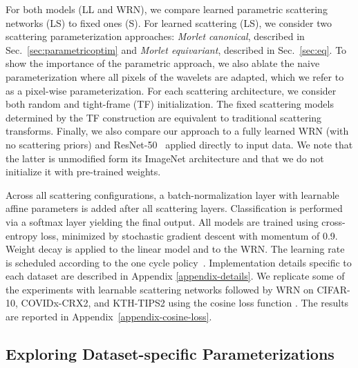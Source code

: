 \documentclass[10pt,twocolumn,letterpaper]{article}
\begin{document}
For both models (LL and WRN), we compare learned parametric scattering networks (LS) to fixed ones (S). For learned scattering (LS), we consider two scattering parameterization approaches: \textit{Morlet canonical}, described in Sec.~\ref{sec:parametricoptim} and \textit{Morlet equivariant},  described in Sec.~\ref{sec:eq}. To show the importance of the parametric approach, we also ablate the naive parameterization where all pixels of the wavelets are adapted, which we refer to as a pixel-wise parameterization.
For each scattering architecture, we consider both random and tight-frame (TF) initialization.  The fixed scattering models determined by the TF construction are equivalent to traditional scattering transforms. Finally, we also compare our approach to a fully learned WRN (with no scattering priors) and ResNet-50~\cite{he2016deep} applied directly to input data. We note that the latter is unmodified form its ImageNet architecture and that we do not initialize it with pre-trained weights. 

Across all scattering configurations, a batch-normalization layer with learnable affine parameters is added after all scattering layers. Classification is performed via a softmax layer yielding the final output. All models are trained using cross-entropy loss, minimized by stochastic gradient descent with momentum of 0.9. Weight decay is applied to the linear model and to the WRN. The learning rate is scheduled according to the one cycle policy~\cite{smith2019super}. Implementation details specific to each dataset are described in Appendix \ref{appendix-details}. 
We replicate some of the experiments with learnable scattering networks followed by WRN on CIFAR-10, COVIDx-CRX2, and KTH-TIPS2 using the cosine loss function \cite{barz2020deep}. The results are reported in Appendix~\ref{appendix-cosine-loss}.



\subsection{Exploring Dataset-specific Parameterizations}
\label{section:converging}
\end{document}
